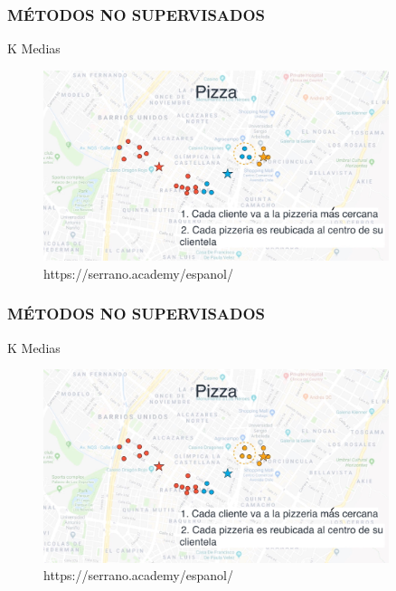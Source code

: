 \documentclass{beamer}
\begin{document}
\begin{frame}
	\frametitle{MÉTODOS NO SUPERVISADOS}
	\begin{block}{K Medias}	
		\begin{figure}
			\includegraphics[width=0.9\textwidth]{Imagenes_k_means/IMG_3513.jpg}
			\caption{https://serrano.academy/espanol/}
		\end{figure}
	\end{block}
\end{frame}

\begin{frame}
	\frametitle{MÉTODOS NO SUPERVISADOS}
	\begin{block}{K Medias}	
		\begin{figure}
			\includegraphics[width=0.9\textwidth]{Imagenes_k_means/IMG_3514.jpg}
			\caption{https://serrano.academy/espanol/}
		\end{figure}
	\end{block}
\end{frame}
\end{document}
